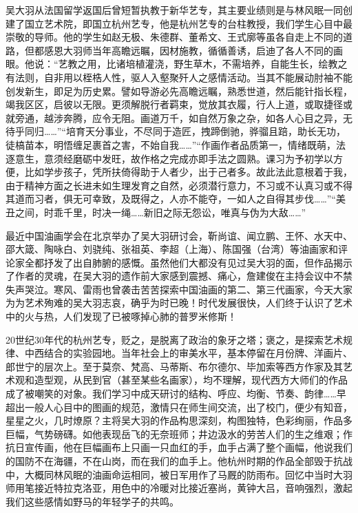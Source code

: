\documentclass{article}
\begin{document}
吴大羽从法国留学返国后曾短暂执教于新华艺专，其主要业绩则是与林风眠一同创建了国立艺术院，即国立杭州艺专，他是杭州艺专的台柱教授，我们学生心目中最崇敬的导师。他的学生如赵无极、朱德群、董希文、王式廓等虽各自走上不同的道路，但都感恩大羽师当年高瞻远瞩，因材施教，循循善诱，启迪了各人不同的画眼。他说：“艺教之用，比诸培植灌浇，野生草木，不需培养，自能生长，绘教之有法则，自非用以桎梏人性，驱人入壑聚歼人之感情活动。当其不能展动肘袖不能创发新生，即足为历史累。譬如导游必先高瞻远瞩，熟悉世道，然后能针指长程，竭我区区，启彼以无限。更须解脱行者羁束，觉放其衣履，行人上道，或取捷径或就旁通，越涉奔腾，应令无阻。画道万千，如自然万象之杂，如各人心目之异，无待乎同归……”“培育天分事业，不尽同于造匠，拽蹄倒驰，骅骝且踣，助长无功，徒槁苗本，明悟缠足裹首之害，不始自我……”“作画作者品质第一，情绪既萌，法逐意生，意须经磨砺中发旺，故作格之完成亦即手法之圆熟。课习为予初学以方便，比如学步孩子，凭所扶倚得助于人者少，出于己者多。故此法此意根着于我，由于精神方面之长进未如生理发育之自然，必须潜行意力，不习或不认真习或不得其道而习者，俱无可幸致，及既得之，人亦不能夺，一如人之自得其步伐……”“美丑之间，时乖千里，时决一绳……新旧之际无怨讼，唯真与伪为大敌……”

最近中国油画学会在北京举办了吴大羽研讨会，靳尚谊、闻立鹏、王怀、水天中、邵大箴、陶咏白、刘骁纯、张祖英、李超（上海）、陈国强（台湾）等油画家和评论家全都抒发了出自肺腑的感慨。虽然他们大都没有见过吴大羽的面，但作品揭示了作者的灵魂，在吴大羽的遗作前大家感到震撼、痛心，詹建俊在主持会议中不禁失声哭泣。寒风、雷雨也曾袭击苦苦探索中国油画的第二、第三代画家，今天大家为为艺术殉难的吴大羽志哀，确乎为时已晚！时代发展很快，人们终于认识了艺术中的火与热，人们发现了已被啄掉心肺的普罗米修斯！

20世纪30年代的杭州艺专，贬之，是脱离了政治的象牙之塔；褒之，是探索艺术规律、中西结合的实验园地。当年社会上的审美水平，基本停留在月份牌、洋画片、郎世宁的层次上。至于莫奈、梵高、马蒂斯、布尔德尔、毕加索等西方作家及其艺术观和造型观，从民到官（甚至某些名画家），均不理解，现代西方大师们的作品成了被嘲笑的对象。我们学习中成天研讨的结构、呼应、均衡、节奏、韵律……早超出一般人心目中的图画的规范，激情只在师生间交流，出了校门，便少有知音，星星之火，几时燎原？主将吴大羽的作品构思深刻，构图独特，色彩绚丽，作品多巨幅，气势磅礴。如他表现岳飞的无奈班师；井边汲水的劳苦人们的生之维艰；作抗日宣传画，他在巨幅画布上只画一只血红的手，血手占满了整个画幅，他说我们的国防不在海疆，不在山岗，而在我们的血手上。他杭州时期的作品全部毁于抗战中，大概同林风眠的油画命运相同，被日军用作了马厩的防雨布。回忆中当时大羽师用笔接近特拉克洛亚，用色中的冷暖对比接近塞尚，黄钟大吕，音响强烈，激起我们这些感情如野马的年轻学子的共鸣。
\end{document}
